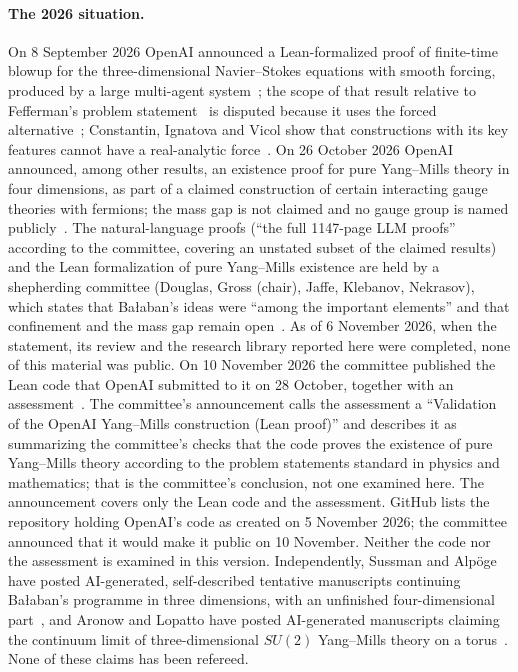\documentclass[11pt]{article}
\theoremstyle{definition}
\theoremstyle{remark}
\begin{document}
\paragraph{The 2026 situation.}
On 8 September 2026 OpenAI announced a Lean-formalized proof of finite-time blowup for the
three-dimensional Navier--Stokes equations with smooth forcing, produced by a large multi-agent
system~\cite{OpenAI2026g,OpenAI2026c,OpenAI2026k,Howlett2026h}; the scope of that result relative to
Fefferman's problem statement~\cite{Fefferman2000} is disputed because it uses the forced
alternative~\cite{Howlett2026b}; Constantin, Ignatova and Vicol show that constructions with its key
features cannot have a real-analytic force~\cite{Constantin2026c}.
On 26 October 2026 OpenAI announced, among other results, an existence proof for pure
Yang--Mills theory in four dimensions, as part of a claimed construction of certain interacting
gauge theories with fermions; the mass gap is not claimed and no gauge group is named
publicly~\cite{OpenAI2026p,Woit2026d,QRC2026,Howlett2026e}. The natural-language proofs (``the full
1147-page LLM proofs'' according to the committee, covering an unstated subset of the claimed results)
and the Lean formalization of pure Yang--Mills existence are held by a shepherding committee (Douglas, Gross (chair), Jaffe, Klebanov, Nekrasov), which states that
Ba{\l}aban's ideas were ``among the important elements'' and that confinement and the mass gap
remain open~\cite{Douglas2026e,Douglas2026d,KITP2026b}. As of 6 November 2026, when the statement, its review and
the research library reported here were completed, none of this material was public. On 10 November
2026 the committee published the Lean code that OpenAI submitted to it on 28 October, together with
an assessment~\cite{Douglas2026g}. The committee's announcement calls the assessment a ``Validation of
the OpenAI Yang--Mills construction (Lean proof)'' and describes it as summarizing the committee's
checks that the code proves the existence of pure Yang--Mills theory according to the problem
statements standard in physics and mathematics; that is the committee's conclusion, not one examined
here. The announcement covers only the Lean code and the assessment. GitHub lists the repository
holding OpenAI's code as created on 5 November 2026; the committee announced that it would make it
public on 10 November. Neither the code nor the assessment is examined in this version. Independently, Sussman and Alp\"oge have posted AI-generated, self-described tentative
manuscripts continuing Ba{\l}aban's programme in three dimensions, with an unfinished
four-dimensional part~\cite{Sussman2026}, and Aronow and Lopatto have posted AI-generated
manuscripts claiming the continuum limit of three-dimensional $SU(2)$ Yang--Mills theory on a
torus~\cite{Aronow2026}. None of these claims has
been refereed.
\end{document}
